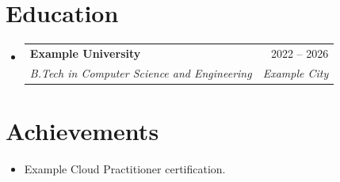 \documentclass[letterpaper,11pt]{article}
\makeatletter
\newcommand{\resumeItem}[1]{
  \item\small{
    {#1 \vspace{-2pt}}
  }
}
\newcommand{\resumeSubheading}[4]{
  \vspace{-2pt}\item
    \begin{tabular*}{0.97\textwidth}[t]{l@{\extracolsep{\fill}}r}
      \textbf{#1} & #2 \\
      \textit{\small#3} & \textit{\small #4} \\
    \end{tabular*}\vspace{-7pt}
}
\newcommand{\resumeSubHeadingListStart}{\begin{itemize}[leftmargin=0.15in, label={}]}
\newcommand{\resumeSubHeadingListEnd}{\end{itemize}}
\makeatother
\begin{document}
\section{Education}
  \resumeSubHeadingListStart
    \resumeSubheading
      {Example University}{2022 -- 2026}
      {B.Tech in Computer Science and Engineering}{Example City}
  \resumeSubHeadingListEnd

\section{Achievements}
 \resumeSubHeadingListStart
  \resumeItem{Example Cloud Practitioner certification.}
 \resumeSubHeadingListEnd
\end{document}
